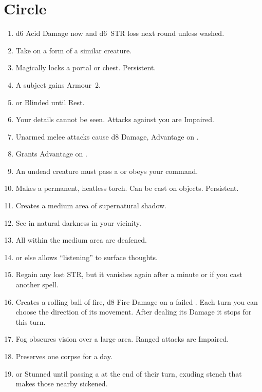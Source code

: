 \documentclass[itdr]{subfiles}
\begin{document}
\vfill
\break

\section{ Circle}
\begin{enumerate}
	\item {} d6 Acid Damage now and d6~STR loss next round unless washed.
	\item {} Take on a form of a similar creature.
	\item {} Magically locks a portal or chest. Persistent.
	\item {} A subject gains Armour~2.
	\item {}  or Blinded until Rest.
	\item {} Your details cannot be seen. Attacks against you are Impaired.
	\item {} Unarmed melee attacks cause d8 Damage, Advantage on .
	\item {} Grants Advantage on .
	\item {} An undead creature must pass a  or obeys your command.
	\item {} Makes a permanent, heatless torch. Can be cast on objects. Persistent.
	\item {} Creates a medium area of supernatural shadow.
	\item {} See in natural darkness in your vicinity.
	\item {} All within the medium area are deafened.
	\item {}  or else allows ``listening'' to surface thoughts.
	\item {} Regain any lost STR, but it vanishes again after a minute or if you cast another spell.
	\item {} Creates a rolling ball of fire, d8 Fire Damage on a failed . Each turn you can choose the direction of its movement. After dealing its Damage it stops for this turn.
	\item {} Fog obscures vision over a large area. Ranged attacks are Impaired.
	\item {} Preserves one corpse for a day.
	\item {}  or Stunned until passing a   at the end of their turn, exuding stench that makes those nearby sickened.

\end{enumerate}
\end{document}
